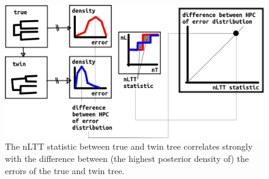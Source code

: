 \begin{figure}[!htbp]
  \includegraphics[width=\textwidth]{20191126_nltt_as_proxy.png}
  \caption{
    The nLTT statistic between true and twin tree correlates strongly
    with the difference between (the highest posterior density
    of) the errors of the true and twin tree.
  }
  \label{fig:nltt_as_proxy}
\end{figure}

